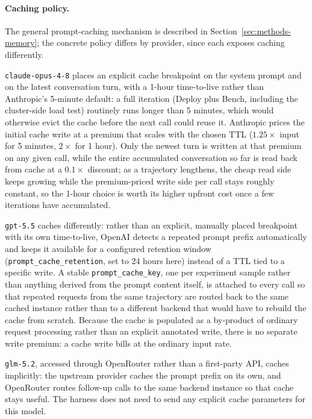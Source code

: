 \paragraph{Caching policy.} The general prompt-caching mechanism is
described in Section~\ref{sec:methods-memory}; the concrete policy differs
by provider, since each exposes caching differently.

\texttt{claude-opus-4-8} places an explicit cache breakpoint on the system
prompt and on the latest conversation turn, with a 1-hour time-to-live
rather than Anthropic's 5-minute default: a full iteration (Deploy plus
Bench, including the cluster-side load test) routinely runs longer than 5
minutes, which would otherwise evict the cache before the next call could
reuse it. Anthropic prices the initial cache write at a premium that
scales with the chosen TTL ($1.25\times$ input for 5 minutes, $2\times$ for
1 hour). Only the newest turn is written at that premium on any given
call, while the entire accumulated conversation so far is read back from
cache at a $0.1\times$ discount; as a trajectory lengthens, the cheap
read side keeps growing while the premium-priced write side per call
stays roughly constant, so the 1-hour choice is worth its higher upfront
cost once a few iterations have accumulated.

\texttt{gpt-5.5} caches differently: rather than an explicit,
manually placed breakpoint with its own time-to-live, OpenAI detects a
repeated prompt prefix automatically and keeps it available for a
configured retention window (\texttt{prompt\_cache\_retention}, set to 24
hours here) instead of a TTL tied to a specific write. A stable
\texttt{prompt\_cache\_key}, one per experiment sample rather than
anything derived from the prompt content itself, is attached to every
call so that repeated requests from the same trajectory are routed back
to the same cached instance rather than to a different backend that would
have to rebuild the cache from scratch. Because the cache is populated as
a by-product of ordinary request processing rather than an explicit
annotated write, there is no separate write premium: a cache write bills
at the ordinary input rate.

\texttt{glm-5.2}, accessed through OpenRouter rather than a first-party
API, caches implicitly: the upstream provider caches the prompt prefix on
its own, and OpenRouter routes follow-up calls to the same backend
instance so that cache stays useful. The harness does not need to send
any explicit cache parameters for this model.

